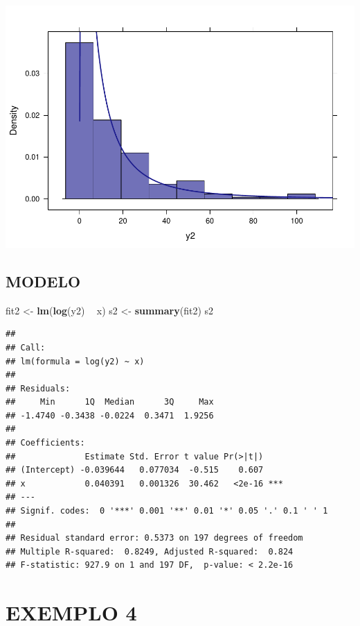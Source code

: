 \documentclass[]{article}
\newenvironment{Shaded}{\begin{snugshade}}{\end{snugshade}}
\newcommand{\KeywordTok}[1]{\textcolor[rgb]{0.13,0.29,0.53}{\textbf{#1}}}
\newcommand{\StringTok}[1]{\textcolor[rgb]{0.31,0.60,0.02}{#1}}
\newcommand{\OperatorTok}[1]{\textcolor[rgb]{0.81,0.36,0.00}{\textbf{#1}}}
\newcommand{\NormalTok}[1]{#1}
\begin{document}
\includegraphics{Impacto_sigma_files/figure-latex/unnamed-chunk-12-1.pdf}

\subsection{MODELO}\label{modelo-2}

\begin{Shaded}
\begin{Highlighting}[]
\NormalTok{fit2 <-}\StringTok{ }\KeywordTok{lm}\NormalTok{(}\KeywordTok{log}\NormalTok{(y2) }\OperatorTok{~}\StringTok{ }\NormalTok{x)}
\NormalTok{s2 <-}\StringTok{ }\KeywordTok{summary}\NormalTok{(fit2)}
\NormalTok{s2}
\end{Highlighting}
\end{Shaded}

\begin{verbatim}
## 
## Call:
## lm(formula = log(y2) ~ x)
## 
## Residuals:
##     Min      1Q  Median      3Q     Max 
## -1.4740 -0.3438 -0.0224  0.3471  1.9256 
## 
## Coefficients:
##              Estimate Std. Error t value Pr(>|t|)    
## (Intercept) -0.039644   0.077034  -0.515    0.607    
## x            0.040391   0.001326  30.462   <2e-16 ***
## ---
## Signif. codes:  0 '***' 0.001 '**' 0.01 '*' 0.05 '.' 0.1 ' ' 1
## 
## Residual standard error: 0.5373 on 197 degrees of freedom
## Multiple R-squared:  0.8249, Adjusted R-squared:  0.824 
## F-statistic: 927.9 on 1 and 197 DF,  p-value: < 2.2e-16
\end{verbatim}

\section{EXEMPLO 4}\label{exemplo-4}
\end{document}
